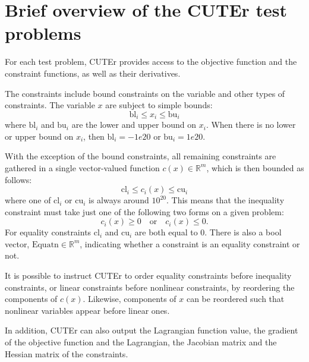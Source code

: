 \section{Brief overview of the CUTEr test problems}\label{sec:cuternm}
For each test problem, CUTEr provides access to the objective function and the constraint functions, as well as their derivatives.

The constraints include bound constraints on the variable and other types of constraints. The variable $x$ are subject to simple bounds:
\begin{equation*}
\text{bl}_i \leq x_i \leq \text{bu}_i  
\end{equation*}
where $\text{bl}_i$ and $\text{bu}_i$ are the lower and upper bound on $x_i$. When there is no lower or upper bound on $x_i$, then $\text{bl}_i = -1e20$ or $\text{bu}_i = 1e20$. 

With the exception of the bound constraints, all remaining 
constraints are gathered in a single vector-valued function $c(x) \in \mathbb{R}^m$, which is then bounded as follows:   
\begin{equation*}
\text{cl}_i \leq c_i(x) \leq \text{cu}_i  
\end{equation*}
where one of $\text{cl}_i$ or $\text{cu}_i$ is always around $10^{20}$. This means that the inequality constraint must take just one of 
the following two forms on a given problem:
\begin{equation*}
c_i(x) \geq 0   \quad  \text{or}  \quad  c_i(x) \leq 0.
\end{equation*}
For equality constraints $\text{cl}_i$ and $\text{cu}_i$ are both equal to 0. There is also a bool vector, $\text{Equatn} \in \mathbb{R}^m$, indicating whether a constraint is an equality constraint or not. 

It is possible to instruct CUTEr to order equality constraints before inequality constraints, or linear constraints before nonlinear constraints, by reordering the components of $c(x)$. Likewise, components of $x$ can be reordered such that nonlinear variables appear before linear ones. 

In addition, CUTEr can also output 
the Lagrangian function value, the gradient of the objective function and the Lagrangian, the Jacobian matrix and the Hessian matrix of the constraints. 


